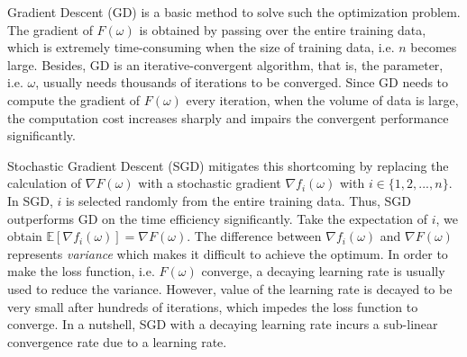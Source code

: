 \documentclass[conference]{IEEEtran}
\begin{document}
Gradient Descent (GD) is a basic method to solve such the optimization problem. The gradient of $F(\omega)$  is obtained by passing over the entire training data, which is extremely time-consuming when the size of training data, i.e. $n$ becomes large.  Besides, GD is an iterative-convergent algorithm, that is, the parameter, i.e. $\omega$, usually needs thousands of iterations to be converged.   Since GD needs to compute the  gradient of  $F(\omega)$ every iteration, when the volume of data is large, the computation cost increases sharply and impairs the convergent performance significantly. 

Stochastic Gradient Descent (SGD) mitigates this shortcoming by replacing the calculation of $\nabla F(\omega)$ with a stochastic gradient $\nabla f_i(\omega)$ with $i\in\{1,2, ..., n\}$. In SGD, $i$ is selected randomly  from the entire training data. Thus, SGD outperforms GD on the time efficiency significantly. Take the expectation of $i$, we obtain $\mathbb{E}[\nabla f_i(\omega)] = \nabla F(\omega)$. The difference between $\nabla f_i(\omega)$ and  $\nabla F(\omega)$ represents \emph{variance} which makes it difficult to achieve the optimum.  In order to make the loss function, i.e. $F(\omega)$ converge, a decaying learning rate is usually used to reduce the variance. However, value of the learning rate is decayed to be very small after hundreds of iterations, which impedes the loss function to converge. In a nutshell, SGD with a decaying learning rate incurs a sub-linear convergence rate due to a learning rate.

\end{document}
